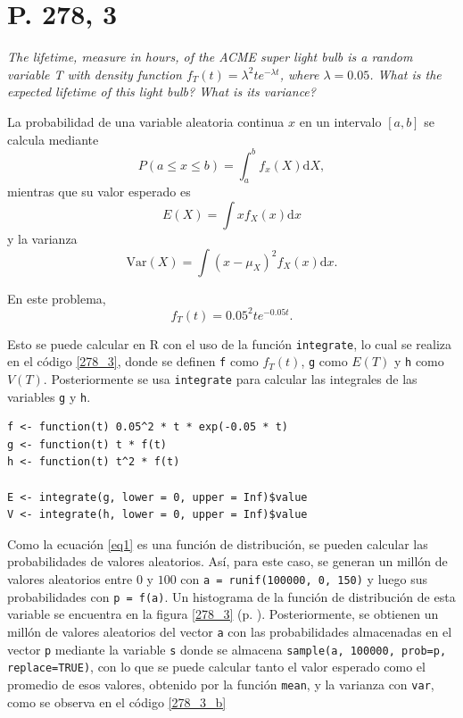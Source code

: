 \documentclass[paper=leter, fontsize=11pt]{scrartcl}
\begin{document}
\section*{P. 278, 3}
\emph{The lifetime, measure in hours, of the ACME super light bulb is a random variable T with density function \(f_T (t) = \lambda^2 te^{- \lambda t}\), where \(\lambda = 0.05\). What is the expected lifetime of this light bulb? What is its variance?}

La probabilidad de una variable aleatoria continua $x$ en un intervalo $[a, b]$ se calcula mediante
\begin{dmath*}
    P(a \leq x \leq b) = \int_a^b f_x(X) \mathrm{d}X,
\end{dmath*}
mientras que su valor esperado es
\begin{dmath*}
    E(X) = \int x f_X(x) \mathrm{d}x
\end{dmath*}
y la varianza
\begin{dmath*}
    \text{Var}(X) = \int (x - \mu_X)^2 f_X(x) \mathrm{d}x.
\end{dmath*}

En este problema,  
\begin{dmath}
    \label{eq1}
    f_T (t) = 0.05^2 te^{- 0.05 t}.
\end{dmath}

Esto se puede calcular en R con el uso de la función \texttt{integrate}, lo cual se realiza en el código \ref{278_3}, donde se definen \texttt{f} como $f_T(t)$, \texttt{g} como $E(T)$ y \texttt{h} como $V(T)$. Posteriormente se usa \texttt{integrate} para calcular las integrales de las variables \texttt{g} y \texttt{h}.

\begin{lstlisting}[caption={P. 278, 3; solución analítica}, captionpos=t, label=278_3]
f <- function(t) 0.05^2 * t * exp(-0.05 * t)
g <- function(t) t * f(t)
h <- function(t) t^2 * f(t)

E <- integrate(g, lower = 0, upper = Inf)$value
V <- integrate(h, lower = 0, upper = Inf)$value
\end{lstlisting}

Como la ecuación \ref{eq1} es una función de distribución, se pueden calcular las probabilidades de valores aleatorios. Así, para este caso, se generan un millón de valores aleatorios entre $0$ y $100$ con \texttt{a = runif(100000, 0, 150)} y luego sus probabilidades con \texttt{p = f(a)}. Un histograma de la función de distribución de esta variable se encuentra en la figura \ref{278_3} (p. \pageref{278_3}). Posteriormente, se obtienen un millón de valores aleatorios del vector \texttt{a} con las probabilidades almacenadas en el vector \texttt{p} mediante la variable \texttt{s} donde se almacena \texttt{sample(a, 100000, prob=p, replace=TRUE)}, con lo que se puede calcular tanto el valor esperado como el promedio de esos valores, obtenido por la función \texttt{mean}, y la varianza con \texttt{var}, como se observa en el código \ref{278_3_b}
\end{document}

